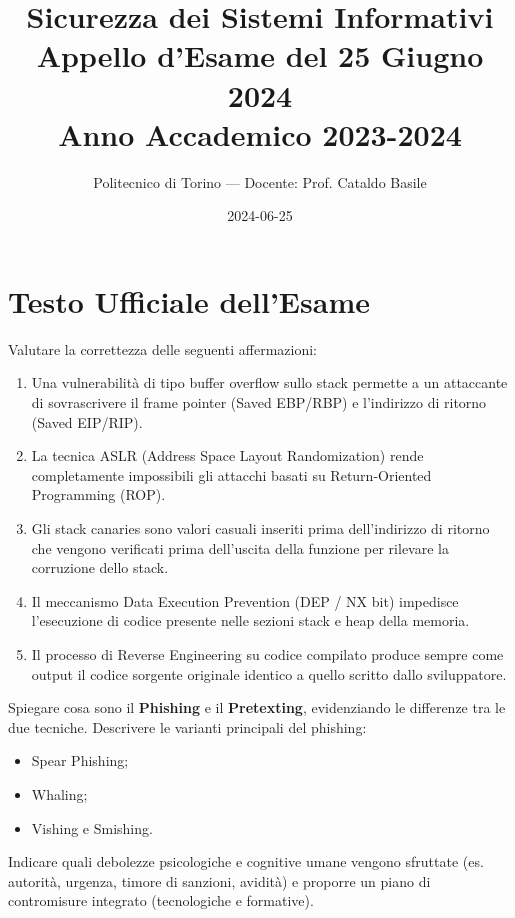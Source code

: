 \documentclass[11pt,a4paper]{article}
\begin{document}
\title{\textbf{Sicurezza dei Sistemi Informativi} \\ \large Appello d'Esame del 25 Giugno 2024 \\ \small Anno Accademico 2023-2024}
\author{Politecnico di Torino --- Docente: Prof. Cataldo Basile}
\date{2024-06-25}
\maketitle


\section{Testo Ufficiale dell'Esame}

\begin{questionbox}
Valutare la correttezza delle seguenti affermazioni:
\begin{enumerate}[label=\alph*.]
    \item Una vulnerabilit\`a di tipo buffer overflow sullo stack permette a un attaccante di sovrascrivere il frame pointer (Saved EBP/RBP) e l'indirizzo di ritorno (Saved EIP/RIP).
    \item La tecnica ASLR (Address Space Layout Randomization) rende completamente impossibili gli attacchi basati su Return-Oriented Programming (ROP).
    \item Gli stack canaries sono valori casuali inseriti prima dell'indirizzo di ritorno che vengono verificati prima dell'uscita della funzione per rilevare la corruzione dello stack.
    \item Il meccanismo Data Execution Prevention (DEP / NX bit) impedisce l'esecuzione di codice presente nelle sezioni stack e heap della memoria.
    \item Il processo di Reverse Engineering su codice compilato produce sempre come output il codice sorgente originale identico a quello scritto dallo sviluppatore.
\end{enumerate}
\end{questionbox}

\begin{questionbox}
Spiegare cosa sono il \textbf{Phishing} e il \textbf{Pretexting}, evidenziando le differenze tra le due tecniche.
Descrivere le varianti principali del phishing:
\begin{itemize}
    \item Spear Phishing;
    \item Whaling;
    \item Vishing e Smishing.
\end{itemize}
Indicare quali debolezze psicologiche e cognitive umane vengono sfruttate (es. autorit\`a, urgenza, timore di sanzioni, avidit\`a) e proporre un piano di contromisure integrato (tecnologiche e formative).
\end{questionbox}
\end{document}
